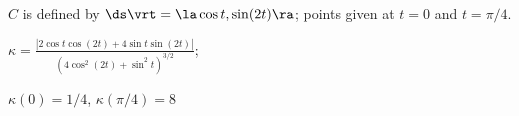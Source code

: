 {$C$ is defined by $\ds \vrt = \la \cos t, \sin (2t)\ra $; points given at $t=0$ and $t=\pi/4$. 
}
{$\kappa = \frac{|2\cos t\cos(2t)+4\sin t\sin(2t)|}{\left(4\cos^2(2t)+\sin^2t\right)^{3/2}}$;

$\kappa(0) = 1/4$, $\kappa(\pi/4) = 8$
}
